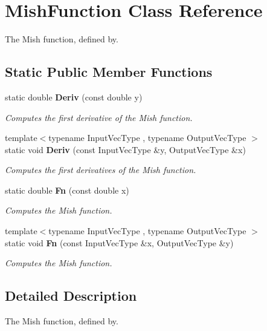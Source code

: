 \section{Mish\+Function Class Reference}
\label{classmlpack_1_1ann_1_1MishFunction}


The Mish function, defined by.  


\subsection*{Static Public Member Functions}
\begin{DoxyCompactItemize}
\item 
static double \textbf{ Deriv} (const double y)
\begin{DoxyCompactList}\small\item\em Computes the first derivative of the Mish function. \end{DoxyCompactList}\item 
{\footnotesize template$<$typename Input\+Vec\+Type , typename Output\+Vec\+Type $>$ }\\static void \textbf{ Deriv} (const Input\+Vec\+Type \&y, Output\+Vec\+Type \&x)
\begin{DoxyCompactList}\small\item\em Computes the first derivatives of the Mish function. \end{DoxyCompactList}\item 
static double \textbf{ Fn} (const double x)
\begin{DoxyCompactList}\small\item\em Computes the Mish function. \end{DoxyCompactList}\item 
{\footnotesize template$<$typename Input\+Vec\+Type , typename Output\+Vec\+Type $>$ }\\static void \textbf{ Fn} (const Input\+Vec\+Type \&x, Output\+Vec\+Type \&y)
\begin{DoxyCompactList}\small\item\em Computes the Mish function. \end{DoxyCompactList}\end{DoxyCompactItemize}


\subsection{Detailed Description}
The Mish function, defined by. 

